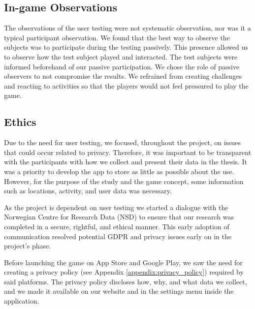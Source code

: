 \subsection{In-game Observations}
The observations of the user testing were not systematic observation, nor was it a typical participant observation. We found that the best way to observe the subjects was to participate during the testing passively. This presence allowed us to observe how the test subject played and interacted. The test subjects were informed beforehand of our passive participation. We chose the role of passive observers to not compromise the results. We refrained from creating challenges and reacting to activities so that the players would not feel pressured to play the game.

\subsection{Ethics}
Due to the need for user testing, we focused, throughout the project, on issues that could occur related to privacy. Therefore, it was important to be transparent with the participants with how we collect and present their data in the thesis.
It was a priority to develop the app to store as little as possible about the use. However, for the purpose of the study and the game concept, some information such as locations, activity, and user data was necessary.

As the project is dependent on user testing we started a dialogue with the Norwegian Centre for Research Data (NSD) to ensure that our research was completed in a secure, rightful, and ethical manner. This early adoption of communication resolved potential GDPR and privacy issues early on in the project’s phase.

Before launching the game on App Store and Google Play, we saw the need for creating a privacy policy (see Appendix \ref{appendix:privacy_policy}) required by said platforms. The privacy policy discloses how, why, and what data we collect, and we made it available on our website and in the settings menu inside the application. 
